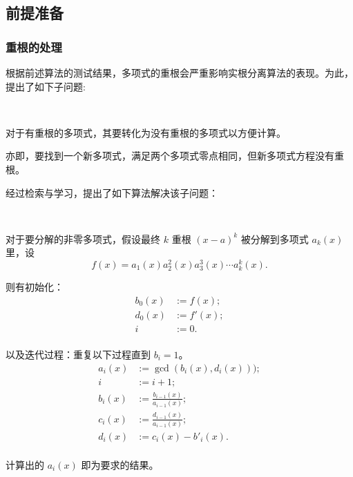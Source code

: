 \subsection{前提准备}

\subsubsection{重根的处理}

	根据前述算法的测试结果，多项式的重根会严重影响实根分离算法的表现。为此，提出了如下子问题:

\begin{problem}[平方因子分解]~

	对于有重根的多项式，其要转化为没有重根的多项式以方便计算。

    亦即，要找到一个新多项式，满足两个多项式零点相同，但新多项式方程没有重根。


\end{problem}

经过检索与学习，提出了如下算法解决该子问题：

\begin{algorithm}~

	对于要分解的非零多项式，假设最终 $k$ 重根 $(x - a)^k$ 被分解到多项式 $a_k(x)$ 里，设
	$$
	f(x) = a_1(x) a_2^2(x) a_3^3(x) \cdots a_k^k (x).
	$$

	则有初始化：
	$$
	\begin{aligned}
		b_0(x) & := f(x); \\
		d_0(x) & := f'(x); \\
		i & := 0. \\
	\end{aligned}
	$$

	以及迭代过程：重复以下过程直到 $b_i = 1$。
	$$
	\begin{aligned}
		a_i(x) & := \gcd(b_i(x), d_i(x))); \\
		i & := i + 1; \\
		b_{i}(x) & := \frac{b_{i-1}(x)}{a_{i-1}(x)}; \\
		c_{i}(x) & := \frac{d_{i-1}(x)}{a_{i-1}(x)}; \\
		d_{i}(x) & := c_{i}(x) - b'_{i}(x). \\
	\end{aligned}
	$$

	计算出的 $a_i(x)$ 即为要求的结果。

	
\end{algorithm}

